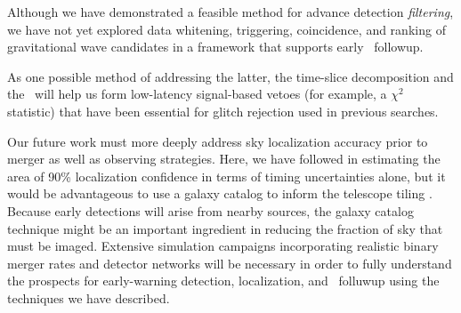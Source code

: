 Although we have demonstrated a feasible method for advance detection
\emph{filtering}, we have not yet explored data whitening, triggering,
coincidence, and ranking of gravitational wave candidates in a framework that
supports early \EM\ followup.
\begin{comment}If adjacent time slices have non-negligible cross-correlation
with each other, then there may be some subtleties in the design of these
postprocessing stages that we must address in order to translate the
early-warning outputs into candidate events.\end{comment}
%
As one possible method of addressing the latter, the time-slice decomposition
and the \SVD\ will help us form low-latency signal-based vetoes (for example, a
$\chi^2$ statistic) that have been essential for glitch rejection used in
previous \GW{} \CBC{} searches.

Our future work must more deeply address sky localization accuracy prior to
merger as well as observing strategies. Here, we have followed
\citet{Fairhurst2009} in estimating the area of 90\% localization confidence in
terms of timing uncertainties alone, but it would be advantageous to use a
galaxy catalog to inform the telescope tiling \citep{galaxy-catalog}. Because
early detections will arise from nearby sources, the galaxy catalog technique
might be an important ingredient in reducing the fraction of sky that must be
imaged.  Extensive simulation campaigns incorporating realistic binary merger
rates and detector networks will be necessary in order to fully understand the
prospects for early-warning detection, localization, and \EM\ folluwup using
the techniques we have described.



